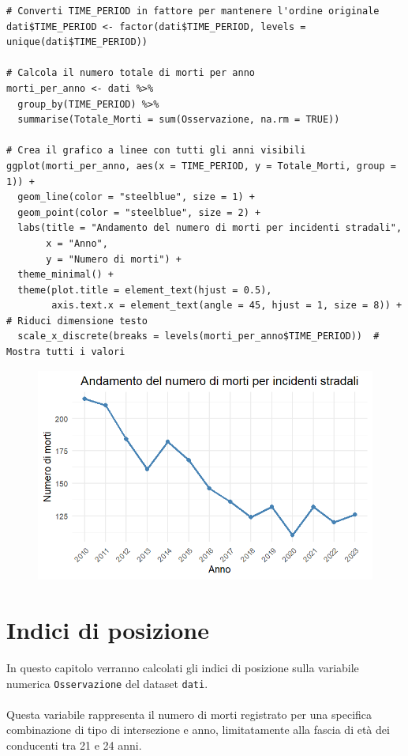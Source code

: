 \documentclass[14pt, openany, titlepage]{report} %
\begin{document}
\begin{center}
\begin{lstlisting}[breaklines=true]
# Converti TIME_PERIOD in fattore per mantenere l'ordine originale
dati$TIME_PERIOD <- factor(dati$TIME_PERIOD, levels = unique(dati$TIME_PERIOD))

# Calcola il numero totale di morti per anno
morti_per_anno <- dati %>%
  group_by(TIME_PERIOD) %>%
  summarise(Totale_Morti = sum(Osservazione, na.rm = TRUE))

# Crea il grafico a linee con tutti gli anni visibili
ggplot(morti_per_anno, aes(x = TIME_PERIOD, y = Totale_Morti, group = 1)) +
  geom_line(color = "steelblue", size = 1) +
  geom_point(color = "steelblue", size = 2) +
  labs(title = "Andamento del numero di morti per incidenti stradali",
       x = "Anno",
       y = "Numero di morti") +
  theme_minimal() +
  theme(plot.title = element_text(hjust = 0.5),
        axis.text.x = element_text(angle = 45, hjust = 1, size = 8)) +  # Riduci dimensione testo
  scale_x_discrete(breaks = levels(morti_per_anno$TIME_PERIOD))  # Mostra tutti i valori
\end{lstlisting}  
\end{center}

\begin{figure}[H] %
    \centering
    \includegraphics[width=12cm, height=7cm]{Rplot01.png} %
\end{figure}



\chapter{Indici di posizione}
In questo capitolo verranno calcolati gli indici di posizione 
sulla variabile numerica \texttt{Osservazione} del dataset 
\texttt{dati}. \\\\
\noindent
Questa variabile rappresenta il numero di morti
 registrato per una specifica combinazione di tipo di intersezione 
 e anno, limitatamente alla fascia di età dei conducenti tra 21 e 24 
 anni. 
\end{document}
